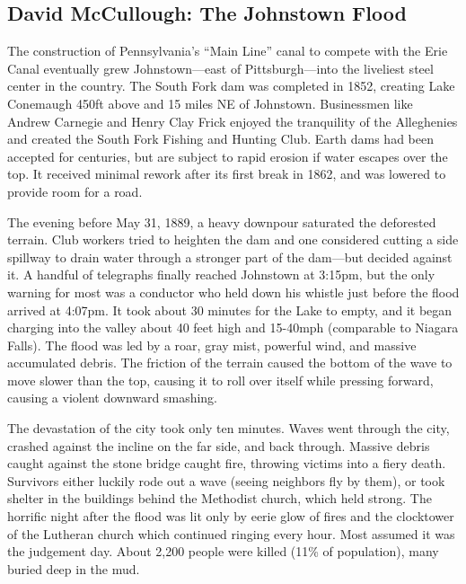 \documentclass[
]{article}
\begin{document}
\hypertarget{david-mccullough-the-johnstown-flood}{%
\subsection{David McCullough: The Johnstown
Flood}\label{david-mccullough-the-johnstown-flood}}

The construction of Pennsylvania's ``Main Line'' canal to compete with
the Erie Canal eventually grew Johnstown---east of Pittsburgh---into the
liveliest steel center in the country. The South Fork dam was completed
in 1852, creating Lake Conemaugh 450ft above and 15 miles NE of
Johnstown. Businessmen like Andrew Carnegie and Henry Clay Frick enjoyed
the tranquility of the Alleghenies and created the South Fork Fishing
and Hunting Club. Earth dams had been accepted for centuries, but are
subject to rapid erosion if water escapes over the top. It received
minimal rework after its first break in 1862, and was lowered to provide
room for a road.

The evening before May 31, 1889, a heavy downpour saturated the
deforested terrain. Club workers tried to heighten the dam and one
considered cutting a side spillway to drain water through a stronger
part of the dam---but decided against it. A handful of telegraphs
finally reached Johnstown at 3:15pm, but the only warning for most was a
conductor who held down his whistle just before the flood arrived at
4:07pm. It took about 30 minutes for the Lake to empty, and it began
charging into the valley about 40 feet high and 15-40mph (comparable to
Niagara Falls). The flood was led by a roar, gray mist, powerful wind,
and massive accumulated debris. The friction of the terrain caused the
bottom of the wave to move slower than the top, causing it to roll over
itself while pressing forward, causing a violent downward smashing.

The devastation of the city took only ten minutes. Waves went through
the city, crashed against the incline on the far side, and back through.
Massive debris caught against the stone bridge caught fire, throwing
victims into a fiery death. Survivors either luckily rode out a wave
(seeing neighbors fly by them), or took shelter in the buildings behind
the Methodist church, which held strong. The horrific night after the
flood was lit only by eerie glow of fires and the clocktower of the
Lutheran church which continued ringing every hour. Most assumed it was
the judgement day. About 2,200 people were killed (11\% of population),
many buried deep in the mud.
\end{document}
